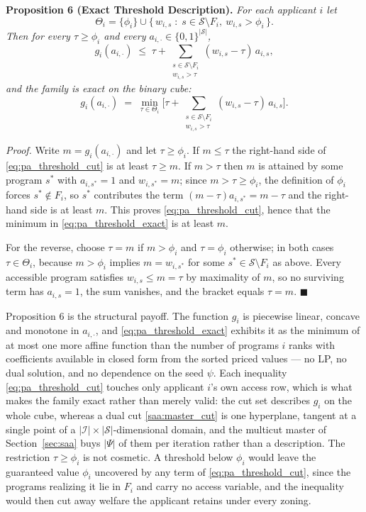 \documentclass{article}
\begin{document}
\noindent\textbf{Proposition 6 (Exact Threshold Description).} \textit{For each applicant $i$ let}
$$\Theta_i = \{\phi_i\} \cup \{\, w_{i,s} \;:\; s \in \mathcal{S} \setminus F_i, \ w_{i,s} > \phi_i \,\}.$$
\textit{Then for every $\tau \geq \phi_i$ and every $a_{i, \cdot} \in \{0,1\}^{|\mathcal{S}|}$,}
\begin{equation}\label{eq:pa_threshold_cut}
g_i(a_{i, \cdot}) \;\leq\; \tau + \sum_{\substack{s \in \mathcal{S} \setminus F_i \\ w_{i,s} > \tau}} (w_{i,s} - \tau)\, a_{i,s},
\end{equation}
\textit{and the family is exact on the binary cube:}
\begin{equation}\label{eq:pa_threshold_exact}
g_i(a_{i, \cdot}) \;=\; \min_{\tau \in \Theta_i} \Bigg[ \tau + \sum_{\substack{s \in \mathcal{S} \setminus F_i \\ w_{i,s} > \tau}} (w_{i,s} - \tau)\, a_{i,s} \Bigg].
\end{equation}

\textit{Proof.} Write $m = g_i(a_{i, \cdot})$ and let $\tau \geq \phi_i$. If $m \leq \tau$ the right-hand side of \eqref{eq:pa_threshold_cut} is at least $\tau \geq m$. If $m > \tau$ then $m$ is attained by some program $s^\ast$ with $a_{i, s^\ast} = 1$ and $w_{i, s^\ast} = m$; since $m > \tau \geq \phi_i$, the definition of $\phi_i$ forces $s^\ast \notin F_i$, so $s^\ast$ contributes the term $(m - \tau) a_{i, s^\ast} = m - \tau$ and the right-hand side is at least $m$. This proves \eqref{eq:pa_threshold_cut}, hence that the minimum in \eqref{eq:pa_threshold_exact} is at least $m$.

For the reverse, choose $\tau = m$ if $m > \phi_i$ and $\tau = \phi_i$ otherwise; in both cases $\tau \in \Theta_i$, because $m > \phi_i$ implies $m = w_{i, s^\ast}$ for some $s^\ast \in \mathcal{S} \setminus F_i$ as above. Every accessible program satisfies $w_{i,s} \leq m = \tau$ by maximality of $m$, so no surviving term has $a_{i,s} = 1$, the sum vanishes, and the bracket equals $\tau = m$. $\blacksquare$

Proposition 6 is the structural payoff. The function $g_i$ is piecewise linear, concave and monotone in $a_{i, \cdot}$, and \eqref{eq:pa_threshold_exact} exhibits it as the minimum of at most one more affine function than the number of programs $i$ ranks with coefficients available in closed form from the sorted priced values --- no LP, no dual solution, and no dependence on the seed $\psi$. Each inequality \eqref{eq:pa_threshold_cut} touches only applicant $i$'s own access row, which is what makes the family exact rather than merely valid: the cut set describes $g_i$ on the whole cube, whereas a dual cut \eqref{saa:master_cut} is one hyperplane, tangent at a single point of a $|\mathcal{I}| \times |\mathcal{S}|$-dimensional domain, and the multicut master of Section~\ref{sec:saa} buys $|\Psi|$ of them per iteration rather than a description. The restriction $\tau \geq \phi_i$ is not cosmetic. A threshold below $\phi_i$ would leave the guaranteed value $\phi_i$ uncovered by any term of \eqref{eq:pa_threshold_cut}, since the programs realizing it lie in $F_i$ and carry no access variable, and the inequality would then cut away welfare the applicant retains under every zoning.
\end{document}
